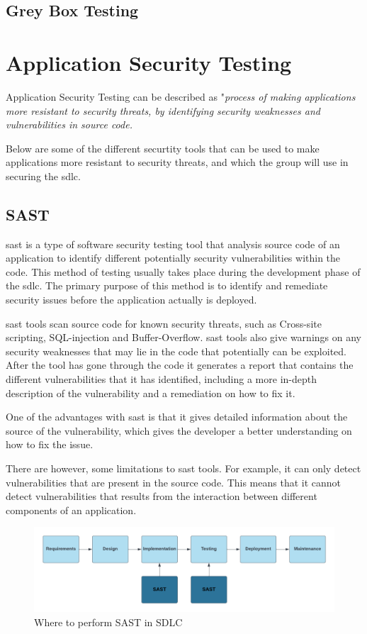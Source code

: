 \subsection{Grey Box Testing}

\newpage

\section{Application Security Testing}
Application Security Testing can be described as "\textit{process of making applications more resistant to security threats, by identifying security weaknesses and vulnerabilities in source code.}\cite{AST}

Below are some of the different securtity tools that can be used to make applications more resistant to security threats, and which the group will use in securing the \acrshort{sdlc}.

\subsection{SAST}
\acrlong{sast} is a type of software security testing tool that analysis source code of an application to identify different potentially security vulnerabilities within the code. This method of testing usually takes place during the development phase of the \acrlong{sdlc}. The primary purpose of this method is to identify and remediate security issues before the application actually is deployed. \cite{sast}

\acrshort{sast} tools scan source code for known security threats, such as \gls{Cross-site scripting}, \gls{SQL-injection} and \gls{Buffer-Overflow}. \acrshort{sast} tools also give warnings on any security weaknesses that may lie in the code that potentially can be exploited. After the tool has gone through the code it generates a report that contains the different vulnerabilities that it has identified, including a more in-depth description of the vulnerability and a remediation on how to fix it. 

One of the advantages with \acrshort{sast} is that it gives detailed information about the source of the vulnerability, which gives the developer a better understanding on how to fix the issue. 

There are however, some limitations to \acrshort{sast} tools. For example, it can only detect vulnerabilities that are present in the source code. This means that it cannot detect vulnerabilities that results from the interaction between different components of an application.
\begin{figure}[H]
    \centering
    \includegraphics[width=1\columnwidth]{Images/SAST.png}
    \caption{Where to perform SAST in SDLC}
    \label{fig: Performance of SAST in SDLC}
\end{figure}

